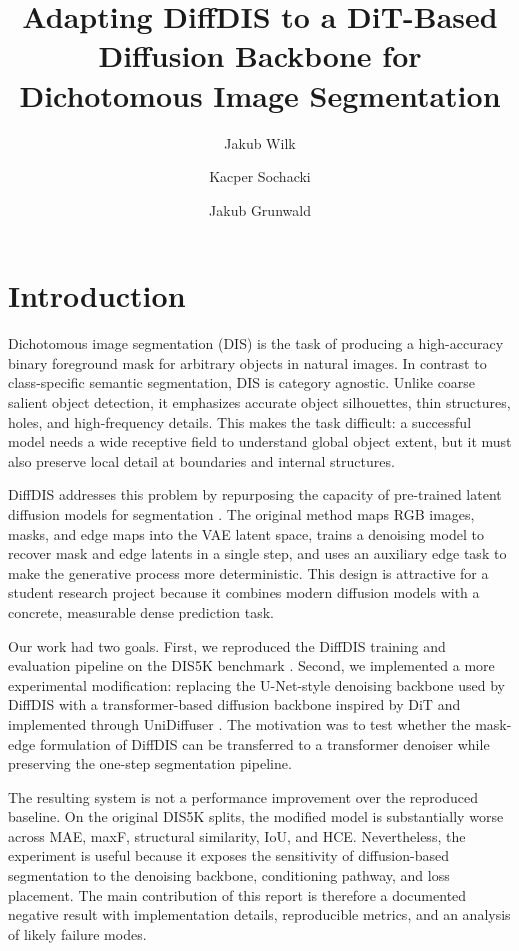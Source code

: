 \documentclass[sigconf,nonacm]{acmart}
\title{Adapting DiffDIS to a DiT-Based Diffusion Backbone for Dichotomous Image Segmentation}
\author{Jakub Wilk}
\affiliation{%
  \institution{Gdansk University of Technology}
  \city{Gdansk}
  \country{Poland}}
\author{Kacper Sochacki}
\affiliation{%
  \institution{Gdansk University of Technology}
  \city{Gdansk}
  \country{Poland}}
\author{Jakub Grunwald}
\affiliation{%
  \institution{Gdansk University of Technology}
  \city{Gdansk}
  \country{Poland}}
\begin{document}
\maketitle

\section{Introduction}
Dichotomous image segmentation (DIS) is the task of producing a high-accuracy binary foreground mask for arbitrary objects in natural images. In contrast to class-specific semantic segmentation, DIS is category agnostic. Unlike coarse salient object detection, it emphasizes accurate object silhouettes, thin structures, holes, and high-frequency details. This makes the task difficult: a successful model needs a wide receptive field to understand global object extent, but it must also preserve local detail at boundaries and internal structures.

DiffDIS addresses this problem by repurposing the capacity of pre-trained latent diffusion models for segmentation \cite{yu2025diffdis}. The original method maps RGB images, masks, and edge maps into the VAE latent space, trains a denoising model to recover mask and edge latents in a single step, and uses an auxiliary edge task to make the generative process more deterministic. This design is attractive for a student research project because it combines modern diffusion models with a concrete, measurable dense prediction task.

Our work had two goals. First, we reproduced the DiffDIS training and evaluation pipeline on the DIS5K benchmark \cite{qin2022dis}. Second, we implemented a more experimental modification: replacing the U-Net-style denoising backbone used by DiffDIS with a transformer-based diffusion backbone inspired by DiT \cite{peebles2023dit} and implemented through UniDiffuser \cite{bao2023unidiffuser}. The motivation was to test whether the mask-edge formulation of DiffDIS can be transferred to a transformer denoiser while preserving the one-step segmentation pipeline.

The resulting system is not a performance improvement over the reproduced baseline. On the original DIS5K splits, the modified model is substantially worse across MAE, maxF, structural similarity, IoU, and HCE. Nevertheless, the experiment is useful because it exposes the sensitivity of diffusion-based segmentation to the denoising backbone, conditioning pathway, and loss placement. The main contribution of this report is therefore a documented negative result with implementation details, reproducible metrics, and an analysis of likely failure modes.
\end{document}
